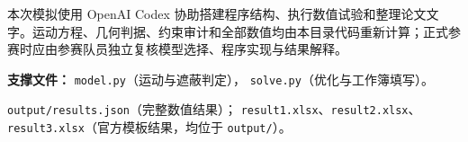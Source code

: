 \documentclass[12pt]{article}
\begin{document}
\begin{aideclaration}[AI 工具使用声明]
本次模拟使用 OpenAI Codex 协助搭建程序结构、执行数值试验和整理论文文字。运动方程、几何判据、约束审计和全部数值均由本目录代码重新计算；正式参赛时应由参赛队员独立复核模型选择、程序实现与结果解释。
\end{aideclaration}

\par\medskip
\noindent\textbf{支撑文件：}
\texttt{model.py}（运动与遮蔽判定），
\texttt{solve.py}（优化与工作簿填写）。
\par\noindent
\texttt{output/results.json}（完整数值结果）；
\texttt{result1.xlsx}、\texttt{result2.xlsx}、
\texttt{result3.xlsx}（官方模板结果，均位于 \texttt{output/}）。
\end{document}
